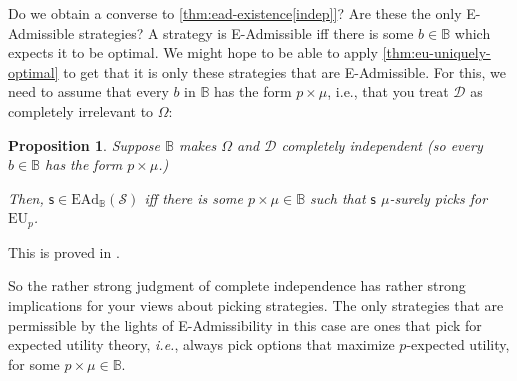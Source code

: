 \documentclass[a4paper]{article}
\newtheorem{proposition}[theorem]{Proposition}
\newcommand\EU{\mathrm{EU}}
\newcommand\EAd{\mathrm{EAd}}
\newcommand{\D}{\mathcal{D}}
\newcommand{\Decs}{\mathcal{D}}
\renewcommand\S{\mathcal{S}}
\newcommand\s{\mathsf{s}}
\newcommand{\IB}{\mathbb{B}}
\renewcommand{\color}[1]{}
\newcommand{\Strategies}{\S}
\newenvironment{CCM rewritten}
{\begingroup\color{blue}} %
{\endgroup}              %
\begin{document}
Do we obtain a converse to \cref{thm:ead-existence[indep]}?  Are these the only E-Admissible strategies? 
A strategy is E-Admissible iff there is some $b\in\IB$ which expects it to be optimal.
We might hope to be able to apply \cref{thm:eu-uniquely-optimal} to get that it is only these strategies that are E-Admissible. For this, we need to assume that every $b$ in $\IB$ has the form $p\times\mu$, i.e., that you treat $\D$ as completely irrelevant to $\Omega$:


\begin{proposition}\label{thm:ead-equiv[indep]} 	Suppose $\IB$ makes $\Omega$ and $\Decs$ completely independent (so every $b\in\IB$ has the form $p\times\mu$.)
	
	Then, $\s\in\EAd_\IB(\Strategies)$ iff there is some $p\times \mu\in\IB$ such that $\s$ $\mu$-surely picks for $\EU_p$. 
\end{proposition}

This is proved in .

So the rather strong judgment of complete independence has rather strong implications for your views about picking strategies. The only strategies that are permissible by the lights of E-Admissibility in this case are ones that pick for expected utility theory, \emph{i.e.}, always pick options that maximize $p$-expected utility, for some $p\times \mu\in\IB$.



\begin{comment}
{\color{violet}
In fact, these are pretty much the only strategies that are permissible by the lights of E-Admissibility when coupled with $\IB$. Immediate from the definition of E-Admissibility, we have that a strategy is in $\EAd_\IB(\S)$ just if it is in $\EU_B(\S)$ for some $B\in\IB$. We can thus make use of \cref{thm:eu-self-rec,thm:eu-uniquely-optimal} to get the following, which applies when we have a strong independence. (In \cref{sect:EAd-dep} we will describe how this assumption can be dropped, but we first analyse it under this assumption.) 

\begin{proposition}\label{thm:ead-equiv[indep]}Suppose every $b\in\IB$ has the form $p\times\mu$.
	
	Then, $\s\in\EAd_\IB(\Strategies)$ iff $\s$ $\mu$-surely picks for $\EU_p$ for some $p\times \mu\in\IB$. 
\end{proposition}}
\end{comment}
\end{document}
